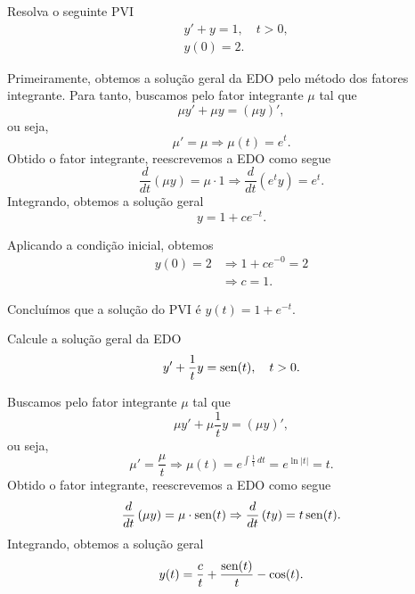 \begin{exeresol}
  Resolva o seguinte PVI
  \begin{align}
    &y' + y = 1, \quad t>0,\\
    &y(0) = 2.
  \end{align}
\end{exeresol}
\begin{resol}
  Primeiramente, obtemos a solução geral da EDO pelo método dos fatores integrante. Para tanto, buscamos pelo fator integrante $\mu$ tal que
  \begin{equation}
    \mu y' + \mu y = (\mu y)',
  \end{equation}
  ou seja,
  \begin{equation}
    \mu' = \mu \Rightarrow \mu(t) = e^{t}.
  \end{equation}
  Obtido o fator integrante, reescrevemos a EDO como segue
  \begin{equation}
    \frac{d}{dt}\left(\mu y\right) = \mu\cdot 1 \Rightarrow \frac{d}{dt}\left(e^ty\right) = e^t.
  \end{equation}
  Integrando, obtemos a solução geral
  \begin{equation}
    y = 1 + ce^{-t}.
  \end{equation}

  Aplicando a condição inicial, obtemos
  \begin{align}
    y(0) = 2 &\Rightarrow 1 + ce^{-0} = 2 \\
             &\Rightarrow c = 1.
  \end{align}

  Concluímos que a solução do PVI é $y(t) = 1 + e^{-t}$.
\end{resol}

\begin{exeresol}
  Calcule a solução geral da EDO
  \begin{align}
    y' + \frac{1}{t}y = \operatorname{sen}(t),\quad t>0.
  \end{align}
\end{exeresol}
\begin{resol}
  Buscamos pelo fator integrante $\mu$ tal que
  \begin{equation}
    \mu y' + \mu \frac{1}{t}y = (\mu y)',
  \end{equation}
  ou seja,
  \begin{equation}
    \mu' = \frac{\mu}{t} \Rightarrow \mu(t) = e^{\int \frac{1}{t}\,dt} = e^{\ln|t|} = t.
  \end{equation}
  Obtido o fator integrante, reescrevemos a EDO como segue
  \begin{equation}
    \frac{d}{dt}\left(\mu y\right) = \mu\cdot \operatorname{sen}(t) \Rightarrow \frac{d}{dt}\left(t y\right) = t\operatorname{sen}(t).
  \end{equation}
  Integrando, obtemos a solução geral
  \begin{equation}
    y(t) = \frac{c}{t}  + \frac{\operatorname{sen}(t)}{t} - \cos(t).
  \end{equation}
\end{resol}

